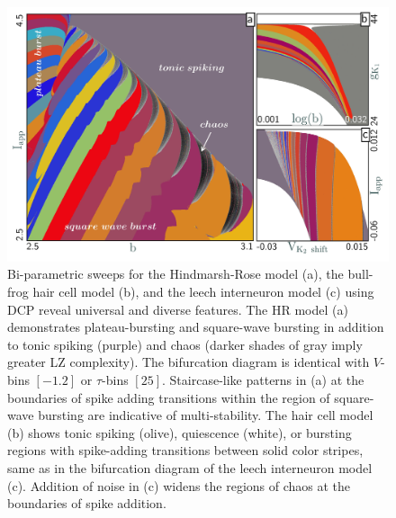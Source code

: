 \documentclass{ws-book9x6}
\begin{document}
\begin{figure}[ht!]
\includegraphics[width=1.\textwidth]{DCPImages/Image2}
\caption{Bi-parametric sweeps for the Hindmarsh-Rose model (a), the bull-frog hair cell model (b), and the leech interneuron model (c) using DCP reveal universal and diverse features. The HR model (a) demonstrates plateau-bursting and square-wave bursting in addition to tonic spiking (purple) and chaos (darker shades of gray imply greater LZ complexity). The bifurcation diagram is identical with $V$-bins $[-1.2]$ or $\tau$-bins $[25]$. Staircase-like patterns in (a) at the boundaries of spike adding transitions within the region of square-wave bursting are indicative of multi-stability. The hair cell model (b) shows tonic spiking (olive), quiescence (white), or bursting regions with spike-adding transitions between solid color stripes, same as in the bifurcation diagram of the leech interneuron model (c). Addition of noise in (c) widens the regions of chaos at the boundaries of spike addition.
}\label{fig:othermodels}
\end{figure}
\end{document}
